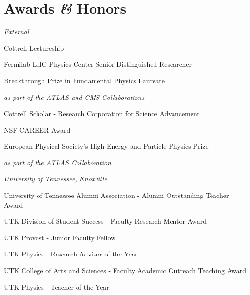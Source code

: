 \documentclass[11pt,letterpaper]{article}
\begin{document}



\section*{Awards \textit{\&} Honors}

\emph{External}

  \begin{itemizetighter}
    \item Cottrell Lectureship 
    \item Fermilab LHC Physics Center Senior Distinguished Researcher 
    \item Breakthrough Prize in Fundamental Physics Laureate  
    \item \hspace{2em}\emph{as part of the ATLAS and CMS Collaborations}
    \item Cottrell Scholar - Research Corporation for Science Advancement 
    \item NSF CAREER Award 
    \item European Physical Society's High Energy and Particle Physics Prize 
    \item \hspace{2em}\emph{as part of the ATLAS Collaboration}
  \end{itemizetighter}


\emph{University of Tennessee, Knoxville}

\begin{itemizetighter}
  \item University of Tennessee Alumni Association -  Alumni Outstanding Teacher Award 
  \item UTK Division of Student Success - Faculty Research Mentor Award 
  \item UTK Provost - Junior Faculty Fellow 
  \item UTK Physics - Research Advisor of the Year 
  \item UTK College of Arts and Sciences - Faculty Academic Outreach Teaching Award 
  \item UTK Physics - Teacher of the Year 
\end{itemizetighter}
\end{document}
